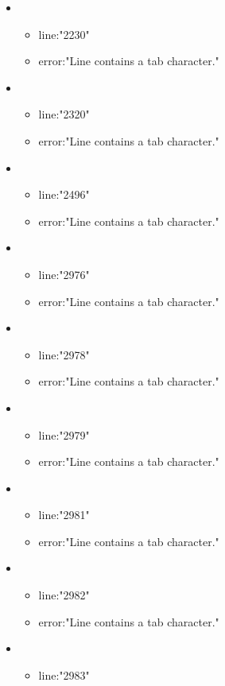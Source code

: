 \begin{itemize}
	\item 
	\begin{itemize} 
		\item line:"2230" 
		\item error:"Line contains a tab character." 
	\end{itemize}
	\item 
	\begin{itemize} 
		\item line:"2320" 
		\item error:"Line contains a tab character." 
	\end{itemize}
	\item 
	\begin{itemize} 
		\item line:"2496" 
		\item error:"Line contains a tab character." 
	\end{itemize}
	\item 
	\begin{itemize} 
		\item line:"2976" 
		\item error:"Line contains a tab character." 
	\end{itemize}
	\item 
	\begin{itemize} 
		\item line:"2978" 
		\item error:"Line contains a tab character." 
	\end{itemize}
	\item 
	\begin{itemize} 
		\item line:"2979" 
		\item error:"Line contains a tab character." 
	\end{itemize}
	\item 
	\begin{itemize} 
		\item line:"2981" 
		\item error:"Line contains a tab character." 
	\end{itemize}
	\item 
	\begin{itemize} 
		\item line:"2982" 
		\item error:"Line contains a tab character." 
	\end{itemize}
	\item 
	\begin{itemize} 
		\item line:"2983" 

\end{itemize}
\end{itemize}
